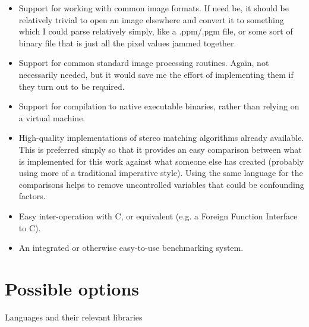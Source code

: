 \begin{itemize}
    \item Support for working with common image formats.  If need be, it should be relatively trivial to open an image elsewhere and convert it to something which I could parse relatively simply, like a .ppm/.pgm file, or some sort of binary file that is just all the pixel values jammed together.
    \item Support for common standard image processing routines.  Again, not necessarily needed, but it would save me the effort of implementing them if they turn out to be required.
    \item Support for compilation to native executable binaries, rather than relying on a virtual machine.
    \item High-quality implementations of stereo matching algorithms already available.  This is preferred simply so that it provides an easy comparison between what is implemented for this work against what someone else has created (probably using more of a traditional imperative style).  Using the same language for the comparisons helps to remove uncontrolled variables that could be confounding factors.
    \item Easy inter-operation with C, or equivalent (e.g. a Foreign Function Interface to C).
    \item An integrated or otherwise easy-to-use benchmarking system.
\end{itemize}

\section{Possible options}
Languages and their relevant libraries


